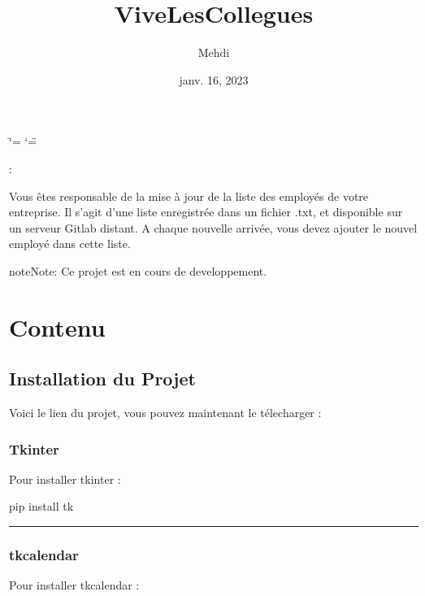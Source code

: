 \documentclass[letterpaper,10pt,french]{sphinxmanual}
\title{ViveLesCollegues}
\date{janv. 16, 2023}
\author{Mehdi}
\begin{document}
\ifdefined\shorthandoff
  \ifnum\catcode`\=\string=\active\shorthandoff{=}\fi
  \ifnum\catcode`\"=\active{}\fi
\fi

\pagestyle{empty}
\sphinxmaketitle
\pagestyle{plain}
\sphinxtableofcontents
\pagestyle{normal}
\label{\detokenize{index::doc}}


\sphinxAtStartPar
{} :

\sphinxAtStartPar
Vous êtes responsable de la mise à jour de la liste des employés de votre entreprise.
Il s’agit d’une liste enregistrée dans un fichier .txt, et disponible sur un serveur Gitlab distant.
A chaque nouvelle arrivée, vous devez ajouter le nouvel employé dans cette liste.

\begin{sphinxadmonition}{note}{Note:}
\sphinxAtStartPar
Ce projet est en cours de developpement.
\end{sphinxadmonition}


\chapter{Contenu}
\label{\detokenize{index:contenu}}
\sphinxstepscope


\section{Installation du Projet}
\label{\detokenize{Installation:installation-du-projet}}\label{\detokenize{Installation::doc}}\label{\detokenize{Installation:installation}}
\sphinxAtStartPar
Voici le lien du projet, vous pouvez maintenant le télecharger : 


\subsection{Tkinter}
\label{\detokenize{Installation:tkinter}}
\sphinxAtStartPar
Pour installer tkinter :

\begin{sphinxVerbatim}[commandchars=\\\{\}]
pip install tk
\end{sphinxVerbatim}


\bigskip\hrule\bigskip



\subsection{tkcalendar}
\label{\detokenize{Installation:tkcalendar}}
\sphinxAtStartPar
Pour installer tkcalendar :
\end{document}

